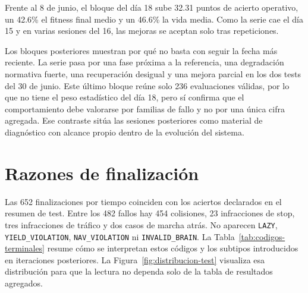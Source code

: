 Frente al 8 de junio, el bloque del día 18 sube 32.31 puntos de acierto operativo, un 42.6\% el fitness final medio y un 46.6\% la vida media. Como la serie cae el día 15 y en varias sesiones del 16, las mejoras se aceptan solo tras repeticiones.

Los bloques posteriores muestran por qué no basta con seguir la fecha más reciente. La serie pasa por una fase próxima a la referencia, una degradación normativa fuerte, una recuperación desigual y una mejora parcial en los dos tests del 30 de junio. Este último bloque reúne solo 236 evaluaciones válidas, por lo que no tiene el peso estadístico del día 18, pero sí confirma que el comportamiento debe valorarse por familias de fallo y no por una única cifra agregada. Ese contraste sitúa las sesiones posteriores como material de diagnóstico con alcance propio dentro de la evolución del sistema.

\newpage
\section{Razones de finalización}

Las 652 finalizaciones por tiempo coinciden con los aciertos declarados en el resumen de test. Entre los 482 fallos hay 454 colisiones, 23 infracciones de stop, tres infracciones de tráfico y dos casos de marcha atrás. No aparecen \texttt{LAZY}, \texttt{YIELD\_VIOLATION}, \texttt{NAV\_VIOLATION} ni \texttt{INVALID\_BRAIN}. La Tabla~\ref{tab:codigos-terminales} resume cómo se interpretan estos códigos y los subtipos introducidos en iteraciones posteriores. La Figura~\ref{fig:distribucion-test} visualiza esa distribución para que la lectura no dependa solo de la tabla de resultados agregados.

